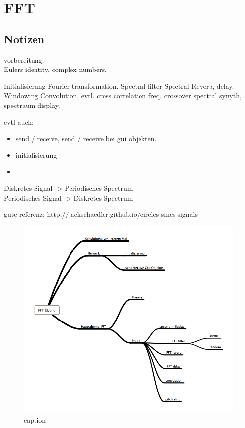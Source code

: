 \chapter{FFT}
\label{FFT}
\section{Notizen}

vorbereitung:\\
Eulers identity, complex numbers.



Initialisierung
Fourier transformation.
Spectral filter
Spectral Reverb, delay.
Windowing
Convolution,
evtl. cross correlation
freq. crossover
spectral synyth,
spectraum display.


evtl auch:
\begin{itemize}
	\item send / receive, send / receive bei gui objekten.
	\item initialisierung
	\item 
\end{itemize}


Diskretes Signal -> Periodisches Spectrum \\
Periodisches Signal -> Diskretes Spectrum

gute referenz:
http://jackschaedler.github.io/circles-sines-signals


\begin{figure}[h]
	\begin{center}
		\includegraphics[width = 14cm]{img/FFToverview.png}
		\caption{caption}
		\label{fig:name}
	\end{center}
\end{figure}

